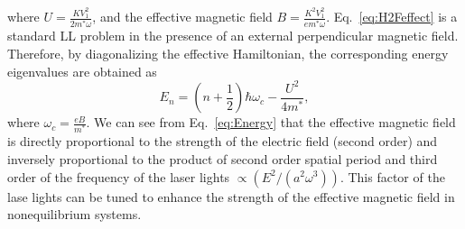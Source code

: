 where $U=\frac{KV_{1}^{2}}{2m^{\ast}\omega}$, and the effective magnetic field
$B=\frac{K^{2}V_{1}^{2}}{em^{\ast}\omega}$. Eq.~\eqref{eq:H2Feffect} is a standard LL problem in the presence of an external perpendicular
magnetic field. Therefore, by diagonalizing the effective Hamiltonian, the corresponding energy eigenvalues are obtained as%
\begin{equation} \label{eq:Energy}
E_{n}=(n+\frac{1}{2})\hbar\omega_{c}-\frac{U^{2}}{4m^{\ast}},
\end{equation}
where $\omega_{c}=\frac{eB}{m^{\ast}}$. We can see from Eq.~\eqref{eq:Energy} that the effective magnetic field is directly proportional to the strength of the electric field (second order) and inversely proportional to the product of second order spatial period and third order of the frequency of the laser lights $\propto (E^2/(a^2\omega^3))$. This factor of the lase lights can be tuned to enhance the strength of the effective magnetic field in nonequilibrium systems.


